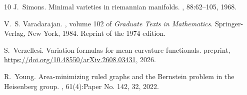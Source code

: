 \begin{thebibliography}{10}
J.~Simons.
\newblock Minimal varieties in riemannian manifolds.
, 88:62--105, 1968.

V.~S. Varadarajan.
, volume 102 of {\em Graduate Texts in Mathematics}.
\newblock Springer-Verlag, New York, 1984.
\newblock Reprint of the 1974 edition.

S.~Verzellesi.
\newblock Variation formulas for mean curvature functionals.
\newblock preprint, \url{https://doi.org/10.48550/arXiv.2608.03431}, 2026.

R.~Young.
\newblock Area-minimizing ruled graphs and the {B}ernstein problem in the {H}eisenberg group.
, 61(4):Paper No. 142, 32, 2022.

\end{thebibliography}
